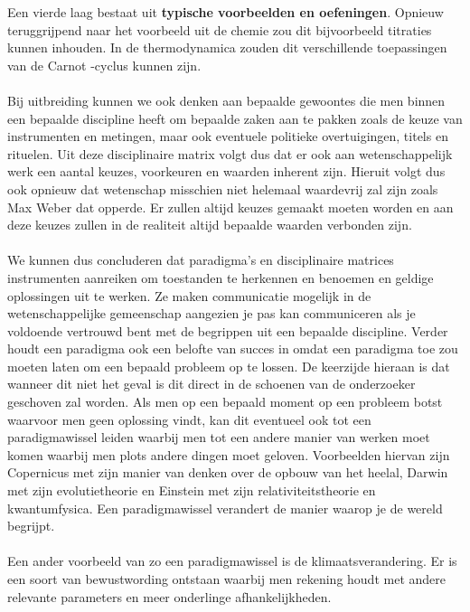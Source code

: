 \documentclass[../summary.tex]{subfiles}
\begin{document}
	Een vierde laag bestaat uit \textbf{typische voorbeelden en oefeningen}. Opnieuw teruggrijpend naar het voorbeeld uit de chemie zou dit bijvoorbeeld titraties kunnen inhouden. In de thermodynamica zouden dit verschillende toepassingen van de Carnot -cyclus kunnen zijn. 
	\\\\
	Bij uitbreiding kunnen we ook denken aan bepaalde gewoontes die men binnen een bepaalde discipline heeft om bepaalde zaken aan te pakken zoals de keuze van instrumenten en metingen, maar ook eventuele politieke overtuigingen, titels en rituelen. Uit deze disciplinaire matrix volgt dus dat er ook aan wetenschappelijk werk een aantal keuzes, voorkeuren en waarden inherent zijn. Hieruit volgt dus ook opnieuw dat wetenschap misschien niet helemaal waardevrij zal zijn zoals Max Weber dat opperde. Er zullen altijd keuzes gemaakt moeten worden en aan deze keuzes zullen in de realiteit altijd bepaalde waarden verbonden zijn.
	\\\\
	We kunnen dus concluderen dat paradigma's en disciplinaire matrices instrumenten aanreiken om toestanden te herkennen en benoemen en geldige oplossingen uit te werken. Ze maken communicatie mogelijk in de wetenschappelijke gemeenschap aangezien je pas kan communiceren als je voldoende vertrouwd bent met de begrippen uit een bepaalde discipline. Verder houdt een paradigma ook een belofte van succes in omdat een paradigma toe zou moeten laten om een bepaald probleem op te lossen. De keerzijde hieraan is dat wanneer dit niet het geval is dit direct in de schoenen van de onderzoeker geschoven zal worden. Als men op een bepaald moment op een probleem botst waarvoor men geen oplossing vindt, kan dit eventueel ook tot een paradigmawissel leiden waarbij men tot een andere manier van werken moet komen waarbij men plots andere dingen moet geloven. Voorbeelden hiervan zijn Copernicus met zijn manier van denken over de opbouw van het heelal, Darwin met zijn evolutietheorie en Einstein met zijn relativiteitstheorie en kwantumfysica. Een paradigmawissel verandert de manier waarop je de wereld begrijpt.
	\\\\
	Een ander voorbeeld van zo een paradigmawissel is de klimaatsverandering. Er is een soort van bewustwording ontstaan waarbij men rekening houdt met andere relevante parameters en meer onderlinge afhankelijkheden.
	
	
	
\end{document}
